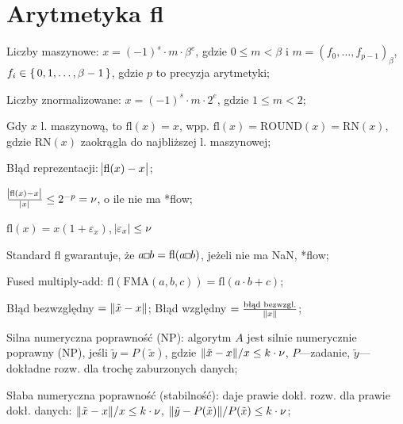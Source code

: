 \section{Arytmetyka fl}

\entry
Liczby maszynowe: $x=(-1)^s \cdot m \cdot \beta^e$, gdzie $0\leq m < \beta$ i $m=(f_0, \ldots, f_{p-1})_\beta$, $f_i\in\set{0,1,\ldots,\beta-1}$, gdzie $p$ to precyzja arytmetyki;

\entry
Liczby znormalizowane: $x=(-1)^s\cdot m \cdot 2^e$, gdzie $1\leq m < 2$;

\entry
Gdy $x$ l. maszynową, to $\mathrm{fl}(x)=x$, wpp. $\mathrm{fl}(x)=\mathrm{ROUND}(x)=\mathrm{RN}(x)$, gdzie $\mathrm{RN}(x)$ zaokrągla do najbliższej l. maszynowej;

\entry
Błąd reprezentacji: $\abs{\mathrm{fl}(x) - x}$;

\entry
$\frac{\abs{\mathrm{fl}(x) - x}}{\abs{x}}\leq 2^{-p}=\nu$, o ile nie ma *flow;

\entry
$\mathrm{fl}(x) = x(1+\varepsilon_x)$, $\abs{\varepsilon_x}\leq \nu$

\entry
Standard fl gwarantuje, że $a \Hsquare b = \mathrm{fl}(a\Hsquare b)$, jeżeli nie ma NaN, *flow;

\entry
Fused multiply-add:
$\mathrm{fl}(\mathrm{FMA}(a,b,c)) = \mathrm{fl}(a \cdot b + c)$;


\entry
Błąd bezwzględny $=\|\tilde{x} - x\|$;
\entry
Błąd względny $=\frac{\text{błąd bezwzgl.}}{\|x\|}$;

\entry
Silna numeryczna poprawność (NP): algorytm $A$ jest silnie numerycznie poprawny (NP), jeśli $\tilde{y} = P(\tilde{x})$, gdzie $\|\tilde{x}-x\| / x\leq k\cdot\nu$, $P$---zadanie, $\tilde{y}$---dokładne rozw. dla trochę zaburzonych danych;

\entry
Słaba numeryczna poprawność (stabilność): daje prawie dokł. rozw. dla prawie dokł. danych: $\|\tilde{x}-x\| / x\leq k\cdot\nu$, $\|\tilde{y}-P(\tilde{x})\| / P(\tilde{x})\leq k\cdot\nu$;
